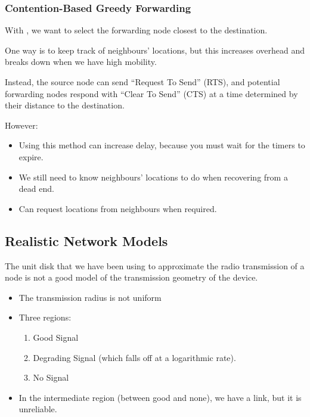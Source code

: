 \subsubsection{Contention-Based Greedy Forwarding}\label{subsubsec:Contention_Based_Greedy_Forwarding}
With , we want to select the forwarding node closest to the destination.

One way is to keep track of neighbours’ locations, but this increases overhead and breaks down when we have high mobility.

Instead, the source node can send ``Request To Send'' (RTS), and potential forwarding nodes respond with ``Clear To Send'' (CTS) at a time determined by their distance to the destination.

However:
\begin{itemize}[noitemsep]
\item Using this method can increase delay, because you must wait for the timers to expire.
\item We still need to know neighbours’ locations to do  when recovering from a dead end.
\item Can request locations from neighbours when required.
\end{itemize}

\subsection{Realistic Network Models}\label{subsec:Realistic_Network_Models}
The unit disk that we have been using to approximate the radio transmission of a node is not a good model of the transmission geometry of the device.
\begin{itemize}[noitemsep]
\item The transmission radius is not uniform
\item Three regions:
  \begin{enumerate}[noitemsep]
  \item Good Signal
  \item Degrading Signal (which falls off at a logarithmic rate).
  \item No Signal
\end{enumerate}

\item In the intermediate region (between good and none), we have a link, but it is unreliable.
\end{itemize}

